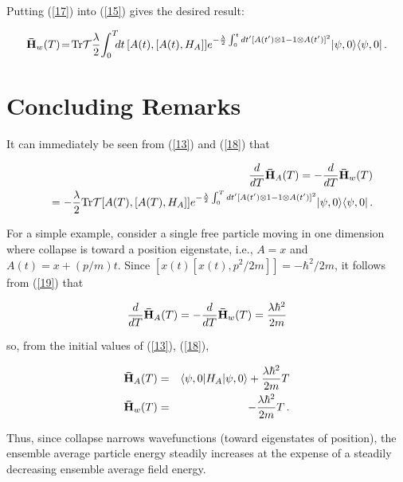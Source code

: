 \documentclass[12pt]{article}
\begin{document}
\noindent Putting (\ref{17}) into (\ref{15}) gives the desired result:

\begin{eqnarray}\label{18}
{\bf \bar{H}}_{w}(T)\!=\!{\rm Tr}{\cal T}\frac{\lambda}{2}\!\int_{0}^{T}\!\!\!dt\,
[A(t),[A(t),H_{A}]]
e^{-\frac{\lambda}{2}\int_{0}^{t}dt'[A(t')\otimes 1-1\otimes A(t')]^{2}}
	|\psi,0\rangle\langle \psi,0|\, .
\end{eqnarray}

\section{Concluding Remarks}\label{Conclusion}

\hspace{\parindent}It can immediately be seen from (\ref{13}) and (\ref{18}) that 
	
\begin{eqnarray}\label{19}
&&\!\!\!\!\!\!\!\!\!\!\!\!\!\!\!\!\!\!\!\!\!\!\!\!\!\!\!
\frac{d}{dT}{\bf \bar{H}}_{A}(T)=-\frac{d}{dT}{\bf \bar{H}}_{w}(T)\nonumber\\
&&=-\frac{\lambda}{2}{\rm Tr}{\cal T}[A(T),[A(T),H_{A}]]
e^{-\frac{\lambda}{2}\int_{0}^{T}dt'[A(t')\otimes 1-1\otimes A(t')]^{2}}
	|\psi,0\rangle\langle \psi,0|\, .
\end{eqnarray}

	For a simple example, consider a single free particle 
moving in one dimension where collapse is toward a position eigenstate\cite{Diosi 89}, i.e., 
$A=x$ and $A(t)=x+(p/m)t$. Since $[x(t)[x(t),p^{2}/2m]]=-\hbar^{2}/2m$, 
it follows from (\ref{19}) that 

\begin{eqnarray*}
\frac{d}{dT}{\bf \bar{H}}_{A}(T)=-\frac{d}{dT}{\bf \bar{H}}_{w}(T)=
\frac{\lambda \hbar^{2}}{2m}
\end{eqnarray*}

\noindent so, from the initial values of (\ref{13}), (\ref{18}),

\begin{eqnarray*}
{\bf \bar{H}}_{A}(T)&=&\langle\psi,0|H_{A}|\psi,0\rangle + \frac{\lambda \hbar^{2}}{2m}T\\
{\bf \bar{H}}_{w}(T)&=&-\frac{\lambda \hbar^{2}}{2m}T\, . 
\end{eqnarray*}

\noindent Thus, since collapse narrows wavefunctions (toward 
eigenstates of position), the ensemble average particle energy steadily increases 
at the expense of a steadily decreasing ensemble average field energy. 
\end{document}
